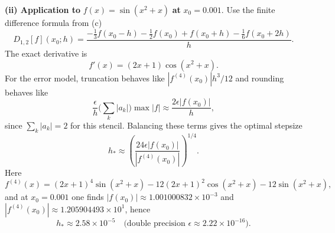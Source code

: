 \documentclass[11pt]{article}
\theoremstyle{definition}
\begin{document}
\noindent \textbf{(ii) Application to }\(f(x)=\sin(x^{2}+x)\)\textbf{ at }\(x_{0}=0.001\).
Use the finite difference formula from (c)
\[
D_{1,2}[f](x_{0};h)=\frac{-\tfrac{1}{3}f(x_{0}-h)-\tfrac{1}{2}f(x_{0})+f(x_{0}+h)-\tfrac{1}{6}f(x_{0}+2h)}{h}.
\]
The exact derivative is
\[
f'(x)=(2x+1)\cos(x^{2}+x).
\]
For the error model, truncation behaves like \(|f^{(4)}(x_{0})|h^{3}/12\) and rounding behaves like
\[
\frac{\epsilon}{h}\Big(\sum_{k}|a_{k}|\Big)\max|f|\approx\frac{2\epsilon|f(x_{0})|}{h},
\]
since \(\sum_{k}|a_{k}|=2\) for this stencil. Balancing these terms gives the optimal stepsize
\[
h_{\ast}\approx\left(\frac{24\epsilon|f(x_{0})|}{|f^{(4)}(x_{0})|}\right)^{1/4}.
\]
Here
\[
f^{(4)}(x)=(2x+1)^{4}\sin(x^{2}+x)-12(2x+1)^{2}\cos(x^{2}+x)-12\sin(x^{2}+x),
\]
and at \(x_{0}=0.001\) one finds \(|f(x_{0})|\approx 1.001000832\times 10^{-3}\) and \(|f^{(4)}(x_{0})|\approx 1.205904493\times 10^{1}\), hence
\[
h_{\ast}\approx 2.58\times 10^{-5}\quad\text{(double precision } \epsilon\approx 2.22\times 10^{-16}\text{)}.
\]
\end{document}
